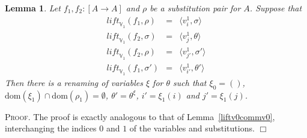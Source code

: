 \documentclass{article}
\newtheorem{lemma}[definition]{Lemma}
\newenvironment{proof}{\smallskip\textsc{Proof.}}{\hspace*{\fill}$\Box$}
\newcommand{\V}{{\mathbb V}}
\newcommand{\liftv}[1]{\ensuremath{\mathit{lift}_{\V_{#1}}}}
\newcommand{\dom}{\ensuremath{\mathrm{dom}}}
\newcommand{\renamevar}[2]{\ensuremath{{#1}^{#2}}}
\newcommand{\isrenamevar}[3]{\ensuremath{{#1}=\renamevar{#2}{#3}}}
\newcommand{\idn}{()}
\begin{document}
\begin{lemma}\label{liftv1commv1}
Let $f_1,f_2:[A\to A]$ and $\rho$ be a substitution pair for $A$.
Suppose that
\begin{eqnarray*}
\liftv1(f_1,\rho) & = & \langle v^1_i,\sigma\rangle\\
\liftv1(f_2,\sigma) & = & \langle v^1_j,\theta\rangle\\
\liftv1(f_2,\rho) & = & \langle v^1_{j'},\sigma'\rangle\\
\liftv1(f_1,\sigma') & = & \langle v^1_{i'},\theta'\rangle
\end{eqnarray*}
Then there is a renaming of variables $\xi$ for $\theta$ such that
$\xi_0=\idn$, $\dom(\xi_1)\cap\dom(\rho_1)=\emptyset$,
{\isrenamevar{\theta'}\theta\xi}, $i'=\xi_1(i)$ and $j'=\xi_1(j)$.
\end{lemma}
\begin{proof}
The proof is exactly analogous to that of Lemma~\ref{liftv0commv0},
interchanging the indices $0$ and $1$ of the variables and substitutions.
\end{proof}
\end{document}

